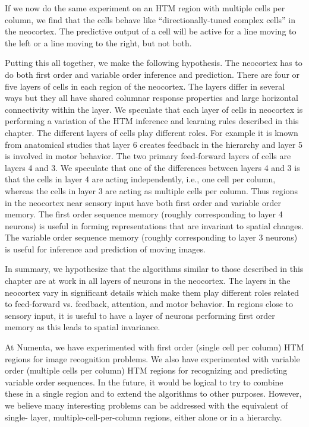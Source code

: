 If we now do the same experiment on an HTM region with multiple cells
per column, we find that the cells behave like ``directionally-tuned
complex cells'' in the neocortex. The predictive output of a cell will
be active for a line moving to the left or a line moving to the right,
but not both.

Putting this all together, we make the following hypothesis. The
neocortex has to do both first order and variable order inference and
prediction. There are four or five layers of cells in each region of
the neocortex. The layers differ in several ways but they all have
shared columnar response properties and large horizontal connectivity
within the layer. We speculate that each layer of cells in neocortex
is performing a variation of the HTM inference and learning rules
described in this chapter. The different layers of cells play
different roles. For example it is known from anatomical studies that
layer 6 creates feedback in the hierarchy and layer 5 is involved in
motor behavior. The two primary feed-forward layers of cells are
layers 4 and 3. We speculate that one of the differences between
layers 4 and 3 is that the cells in layer 4 are acting independently,
i.e., one cell per column, whereas the cells in layer 3 are acting as
multiple cells per column. Thus regions in the neocortex near sensory
input have both first order and variable order memory. The first order
sequence memory (roughly corresponding to layer 4 neurons) is useful
in forming representations that are invariant to spatial changes. The
variable order sequence memory (roughly corresponding to layer 3
neurons) is useful for inference and prediction of moving images.

In summary, we hypothesize that the algorithms similar to those
described in this chapter are at work in all layers of neurons in the
neocortex. The layers in the neocortex vary in significant details
which make them play different roles related to feed-forward
vs. feedback, attention, and motor behavior. In regions close to
sensory input, it is useful to have a layer of neurons performing
first order memory as this leads to spatial invariance.

At Numenta, we have experimented with first order (single cell per
column) HTM regions for image recognition problems. We also have
experimented with variable order (multiple cells per column) HTM
regions for recognizing and predicting variable order sequences. In
the future, it would be logical to try to combine these in a single
region and to extend the algorithms to other purposes. However, we
believe many interesting problems can be addressed with the equivalent
of single- layer, multiple-cell-per-column regions, either alone or in
a hierarchy.
